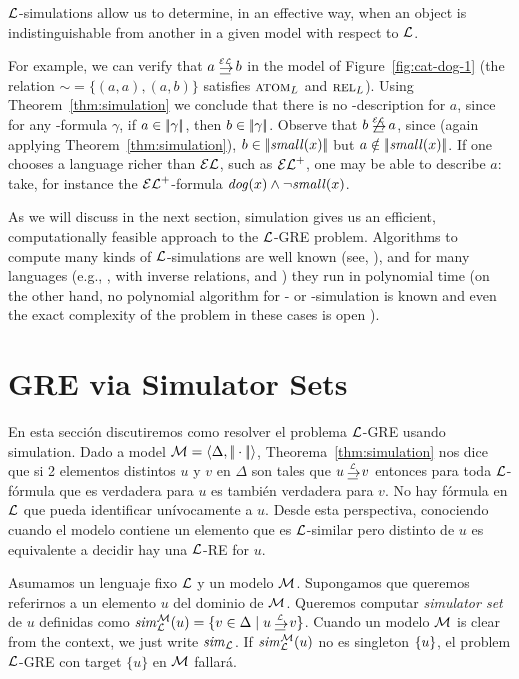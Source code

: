 $\mathcal{L}$-simulations allow us to determine, in an effective way,
when an object is indistinguishable from another in a given model with respect to $\mathcal{L}$.

For example, we can verify that $a \simul{\EL} b$ in the model of
Figure~\ref{fig:cat-dog-1} (the relation ${\sim} = \{(a,a), (a, b) \}
$ satisfies $\textsc{atom}_L$ and $\textsc{rel}_L$).
Using Theorem~\ref{thm:simulation}
we conclude that there is no \EL-description for $a$, since for any \EL-formula $\gamma$,
if $a\in|\!|\gamma|\!|$, then $b\in|\!|\gamma|\!|$.
Observe that $b \not\simul{\EL} a$, since
(again applying Theorem~\ref{thm:simulation}), $b\in|\!|\mathit{small}(x)|\!|$ but
$a\notin|\!|\mathit{small}(x)|\!|$.
%
If one chooses a language richer than $\mathcal{EL}$, such as ${\mathcal{EL}^+}$, one may be
able to describe $a$: take, for instance the ${\mathcal{EL}^+}$-formula
$\mathit{dog}(x)\wedge\lnot\mathit{small}(x)$.


As we will discuss in the next section, simulation gives us an
efficient, computationally feasible approach to the $\mathcal{L}$-GRE
problem. Algorithms to compute many kinds of $\mathcal{L}$-simulations are
well known (see, \cite{H71,areces08,HHK95,DPP03}), and for many
languages  (e.g., \ALC, \ALC with inverse relations,  \ELAN and \EL)
they run in polynomial time (on the other hand, no polynomial
algorithm for \FOL- or \EPFOL-simulation is known and even the exact
complexity of the problem in these cases is open
\cite{gare:comp79}).

\section{GRE via Simulator Sets}\label{sec:simulation}

En esta secci\'on discutiremos como resolver el problema $\mathcal{L}$-GRE
usando simulation. Dado a model $\mathcal{M} = \langle \Delta,
|\!|\cdot|\!| \rangle$, Theorema~\ref{thm:simulation} nos dice que si 2 elementos distintos $u$ y $v$ en $\Delta$ son tales que $u
\simul{\+L} v$ entonces para toda $\mathcal{L}$-f\'ormula que es verdadera para $u$ es tambi\'en verdadera para $v$. No hay f\'ormula en $\mathcal{L}$ que pueda identificar un\'ivocamente a $u$. Desde esta perspectiva, conociendo cuando el modelo contiene un elemento que es $\mathcal{L}$-similar pero distinto de $u$ es
equivalente a decidir hay una $\mathcal{L}$-RE for $u$.


Asumamos un lenguaje fixo $\mathcal{L}$ y un modelo $\mathcal{M}$.  Supongamos que queremos referirnos a un elemento $u$ del dominio de $\mathcal{M}$. Queremos computar \emph{simulator set} de $u$ definidas como
$\simset_{\+L}^{\+M}(u) = \cset{v \in \Delta \mid u \simul{\+L} v}$.
Cuando un modelo $\mathcal{M}$ is clear from the context, we just write
${\it sim}_{\mathcal{L}}$.
 If ${\it sim}_{\mathcal{L}}^{\mathcal{M}}(u)$ no es singleton $\{u\}$,
el problem $\mathcal{L}$-GRE con target $\{u\}$ en $\mathcal{M}$ fallar\'a.


